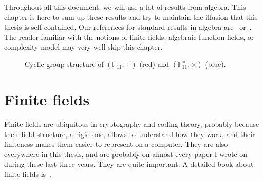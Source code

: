 Throughout all this document, we will use a lot of results from algebra. This
chapter is here to sum up these results and try to maintain the illusion that
this thesis is self-contained. Our references for standard results in algebra
are~\cite{Lang04} or~\cite{Perrin96}.
The reader familiar with the notions of finite
fields, algebraic function fields, or complexity model may very well skip this
chapter.
\minitoc

\begin{figure}
  \centering
  \caption{Cyclic group structure of $(\mathbb{F}_{11}, +)$ (red) and
  $(\mathbb{F}_{11}^\times, \times)$ (blue).}
  \label{fig:finite-field}
\end{figure}
 
%
%

\clearpage
\section{Finite fields}

Finite fields are ubiquitous in cryptography and coding theory, probably because
their field structure, a rigid one, allows to understand how they work, and
their finiteness makes them easier to represent on a computer. They are also
everywhere in this thesis, and are probably on almost every paper I
wrote on during these last three years. They are quite important. A detailed
book about finite fields is~\cite{LN97}.

